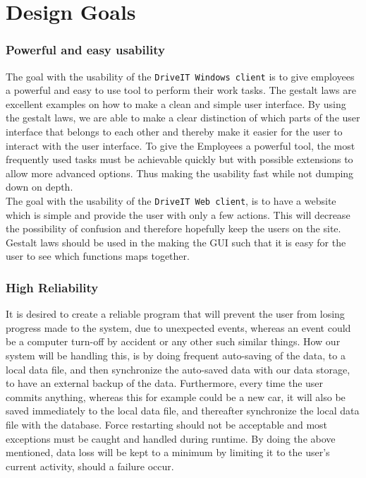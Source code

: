 \section{Design Goals}
\subsubsection{Powerful and easy usability}
The goal with the usability of the \texttt{DriveIT Windows client} is to give employees a powerful and easy to use tool to perform their work tasks. The gestalt laws are excellent examples on how to make a clean and simple user interface. By using the gestalt laws, we are able to make a clear distinction of which parts of the user interface that belongs to each other and thereby make it easier for the user to interact with the user interface. To give the Employees a powerful tool, the most frequently used tasks must be achievable quickly but with possible extensions to allow more advanced options. Thus making the usability fast while not dumping down on depth.\\

The goal with the usability of the \texttt{DriveIT Web client}, is to have a website which is simple and provide the user with only a few actions. This will decrease the possibility of confusion and therefore hopefully keep the users on the site. Gestalt laws should be used in the making the GUI such that it is easy for the user to see which functions maps together.

\subsubsection{High Reliability}
It is desired to create a reliable program that will prevent the user from losing progress made to the system, due to unexpected events, whereas an event could be a computer turn-off by accident or any other such similar things. How our system will be handling this, is by doing frequent auto-saving of the data, to a local data file, and then synchronize the auto-saved data with our data storage, to have an external backup of the data. Furthermore, every time the user commits anything, whereas this for example could be a new car, it will also be saved immediately to the local data file, and thereafter synchronize the local data file with the database. Force restarting should not be acceptable and most exceptions must be caught and handled during runtime. By doing the above mentioned, data loss will be kept to a minimum by limiting it to the user's current activity, should a failure occur.

